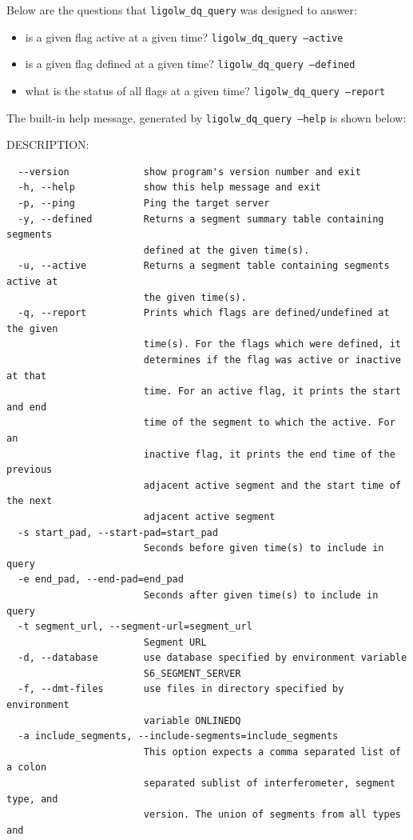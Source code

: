Below are the questions that \texttt{ligolw\_dq\_query} was designed
to answer:

\begin{itemize}
\item is a given flag active at a given time?
\texttt{ligolw\_dq\_query --active}
\item is a given flag defined at a given time?
\texttt{ligolw\_dq\_query --defined}
\item what is the status of all flags at a given time?
\texttt{ligolw\_dq\_query --report}
\end{itemize}


The built-in help message, generated by \texttt{ligolw\_dq\_query
--help} is shown below:

DESCRIPTION:
{\small
\begin{verbatim}
  --version             show program's version number and exit
  -h, --help            show this help message and exit
  -p, --ping            Ping the target server
  -y, --defined         Returns a segment summary table containing segments
                        defined at the given time(s).
  -u, --active          Returns a segment table containing segments active at
                        the given time(s).
  -q, --report          Prints which flags are defined/undefined at the given
                        time(s). For the flags which were defined, it
                        determines if the flag was active or inactive at that
                        time. For an active flag, it prints the start and end
                        time of the segment to which the active. For an
                        inactive flag, it prints the end time of the previous
                        adjacent active segment and the start time of the next
                        adjacent active segment
  -s start_pad, --start-pad=start_pad
                        Seconds before given time(s) to include in query
  -e end_pad, --end-pad=end_pad
                        Seconds after given time(s) to include in query
  -t segment_url, --segment-url=segment_url
                        Segment URL
  -d, --database        use database specified by environment variable
                        S6_SEGMENT_SERVER
  -f, --dmt-files       use files in directory specified by environment
                        variable ONLINEDQ
  -a include_segments, --include-segments=include_segments
                        This option expects a comma separated list of a colon
                        separated sublist of interferometer, segment type, and
                        version. The union of segments from all types and

\end{verbatim}}
